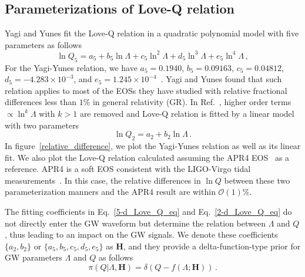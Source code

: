 \documentclass[a4paper,11pt]{article}
\begin{document}
\subsection{Parameterizations of Love-Q relation} 
\label{subsec:framework_parameterization}
Yagi and Yunes fit the Love-Q relation in a quadratic polynomial model with five parameters as follows~\cite{Yagi:2013bca,Yagi:2013awa,Yagi_2017}
\begin{equation}
\label{5-d_Love_Q_eq}
    \ln Q_{5}=a_5 + b_5 \ln \Lambda + c_5 \ln^2\Lambda + d_5 \ln^3\Lambda + e_5 \ln^4 \Lambda\,,
\end{equation}
For the Yagi-Yunes relation, we have $a_5=0.1940$, $b_5=0.09163$, $c_5=0.04812$, $d_5=-4.283\times10^{-3}$, and $e_5=1.245\times10^{-4}$~\cite{Yagi_2017}. Yagi and Yunes found that such relation applies to most of the EOSs they have studied with relative fractional differences less than $1\%$ in general relativity (GR). In Ref.~\cite{Samajdar:2020xrd}, higher order terms $\propto \ln^k \Lambda$ with $k>1$ are removed and Love-Q relation is fitted by a linear model with two parameters
\begin{equation}
\label{2-d_Love_Q_eq}
    \ln Q_{2} = a_2 + b_2 \ln \Lambda\,.
\end{equation}
In figure~\ref{relative_difference}, we plot the Yagi-Yunes relation as well as its linear fit. We also plot the Love-Q relation calculated assuming the APR4 EOS~\cite{PhysRevC.58.1804} as a reference. APR4 is a soft EOS consistent with the LIGO-Virgo tidal measurements~\cite{LIGOScientific:2017vwq,LIGOScientific:2018cki,LIGOScientific:2018hze}. In this case, the relative differences in $\ln Q$ between these two parameterization manners and the APR4 result are within $\mathcal{O}(1) \%$. 

The fitting coefficients in Eq.~\eqref{5-d_Love_Q_eq} and Eq.~\eqref{2-d_Love_Q_eq} do not directly enter the GW waveform but determine the relation between $\Lambda$ and $Q$, thus leading to an impact on the GW signals. We denote these coefficients $\{a_2, b_2\}$ or $\{a_5, b_5, c_5, d_5, e_5\}$ as $\bm{H}$, and they provide a delta-function-type prior for GW parameters $\Lambda$ and $Q$ as follows
\begin{equation}
\label{delta function prior}
\pi(Q|\Lambda,\bm{H}) = \delta(Q-f(\Lambda;\bm{H}))\,.
\end{equation}
\end{document}

